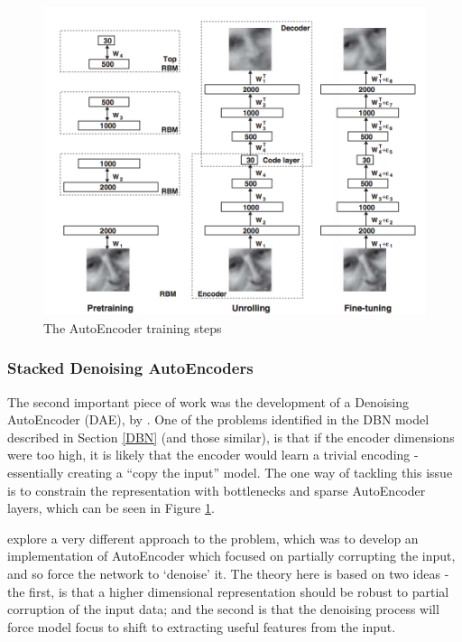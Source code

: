 \documentclass[a4paper,11pt,oneside]{article}
\theoremstyle{plain}
\theoremstyle{definition}
\begin{document}
	\begin{figure}
		\centering \includegraphics[scale=0.5]{images/DBN-RBM-process.png}
		\caption[The AutoEncoder Training Steps]{The AutoEncoder training steps \citep{Hinton2}}
		\label{figure-DBN-RBM}
	\end{figure}
	
	\subsubsection{Stacked Denoising AutoEncoders}\label{lr_SDAE}
	
	The second important piece of work was the development of a Denoising AutoEncoder (DAE), by \citet{Vincent}. 
	One of the problems identified in the DBN model described in Section \ref{DBN} (and those similar), is that if the encoder dimensions were too high, 
	it is likely that the encoder would learn a trivial encoding - essentially creating a ``copy the input'' model. The one way
	of tackling this issue is to constrain the representation with bottlenecks and sparse AutoEncoder layers, which can be seen in Figure \ref{figure-DBN-RBM}.
	\hfill \break 
	
	\citet{Vincent} explore a very different approach to the problem, which was to develop an implementation of 
	AutoEncoder which focused on partially corrupting the input, and so force the network to ‘denoise’ it. The theory 
	here is based on two ideas - the first, is that a higher dimensional representation should be robust to partial 
	corruption of the input data; and the second is that the denoising process will force model focus to shift to 
	extracting useful features from the input.
	\hfill \break 
	
\end{document}
